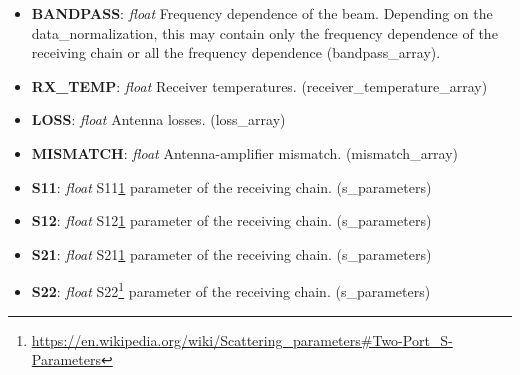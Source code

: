 \documentclass[11pt, oneside]{article}   	%
\begin{document}
\begin{itemize}
\item{\textbf{BANDPASS}: \textit{float} Frequency dependence of the beam. Depending on the data\_normalization, this may contain only the frequency dependence of the receiving chain or all the frequency dependence (bandpass\_array).}
\item{\textbf{RX\_TEMP}: \textit{float} Receiver temperatures. (receiver\_temperature\_array)}
\item{\textbf{LOSS}: \textit{float} Antenna losses. (loss\_array)}
\item{\textbf{MISMATCH}: \textit{float} Antenna-amplifier mismatch. (mismatch\_array)}
\item{\textbf{S11}: \textit{float} S11\cref{first} parameter of the receiving chain. (s\_parameters)}
\item{\textbf{S12}: \textit{float} S12\cref{first} parameter of the receiving chain. (s\_parameters)}
\item{\textbf{S21}: \textit{float} S21\cref{first} parameter of the receiving chain. (s\_parameters)}
\item{\textbf{S22}: \textit{float} S22\footnote{\label{first}\url{https://en.wikipedia.org/wiki/Scattering\_parameters\#Two-Port\_S-Parameters}} parameter of the receiving chain. (s\_parameters)}
\end{itemize}
\end{document}
